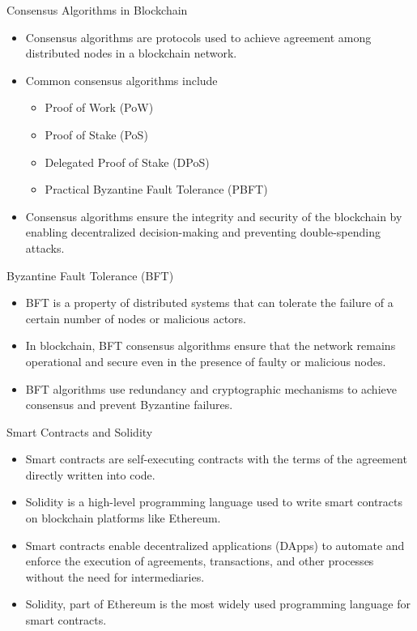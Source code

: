\begin{withoutheadline}
\begin{frame}{Consensus Algorithms in Blockchain}
    \begin{itemize}
        \item Consensus algorithms are protocols used to achieve agreement among distributed nodes in a blockchain network.
        \item Common consensus algorithms include
        \begin{itemize}
            \item Proof of Work (PoW)
            \item Proof of Stake (PoS)
            \item Delegated Proof of Stake (DPoS)
            \item Practical Byzantine Fault Tolerance (PBFT)
        \end{itemize}
        \item Consensus algorithms ensure the integrity and security of the blockchain by enabling decentralized decision-making and preventing double-spending attacks.
    \end{itemize}
\end{frame}

\begin{frame}{Byzantine Fault Tolerance (BFT)}
    \begin{itemize}
        \item BFT is a property of distributed systems that can tolerate the failure of a certain number of nodes or malicious actors.
        \item In blockchain, BFT consensus algorithms ensure that the network remains operational and secure even in the presence of faulty or malicious nodes.
        \item BFT algorithms use redundancy and cryptographic mechanisms to achieve consensus and prevent Byzantine failures.
    \end{itemize}
\end{frame}

\begin{frame}{Smart Contracts and Solidity}
    \begin{itemize}
        \item Smart contracts are self-executing contracts with the terms of the agreement directly written into code.
        \item Solidity is a high-level programming language used to write smart contracts on blockchain platforms like Ethereum.
        \item Smart contracts enable decentralized applications (DApps) to automate and enforce the execution of agreements, transactions, and other processes without the need for intermediaries.
        \item Solidity, part of Ethereum is the most widely used programming language for smart contracts.
    \end{itemize}
\end{frame}


\end{withoutheadline}
